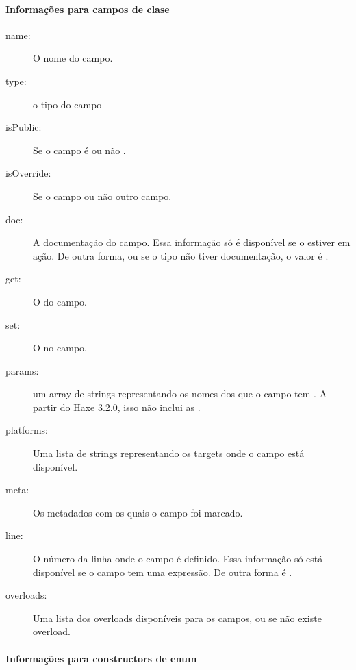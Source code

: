 	
\paragraph{Informações para campos de clase}
\label{cr-rtti-class-field-information}

\begin{description}
    \item[name:] O nome do campo.
    \item[type:] o tipo do campo
    \item[isPublic:] Se o campo é ou não .
    \item[isOverride:] Se o campo  ou não outro campo.
    \item[doc:] A documentação do campo. Essa informação só é disponível se o    estiver em ação. De outra forma, ou se o tipo não tiver documentação, o valor é .
    \item[get:] O  do campo.
    \item[set:] O  no campo.
    \item[params:] um array de strings representando os nomes dos  que o campo tem . A partir do Haxe 3.2.0, isso não inclui as .
    \item[platforms:] Uma lista de strings representando os targets onde o campo está disponível.
    \item[meta:] Os metadados com os quais o campo foi marcado.
    \item[line:] O número da linha onde o campo é definido. Essa informação só está disponível se o campo tem uma expressão. De outra forma é .
    \item[overloads:] Uma lista dos overloads disponíveis para os campos, ou  se não existe overload.
\end{description}

\paragraph{Informações para constructors de enum}
\label{cr-rtti-enum-constructor-information}

